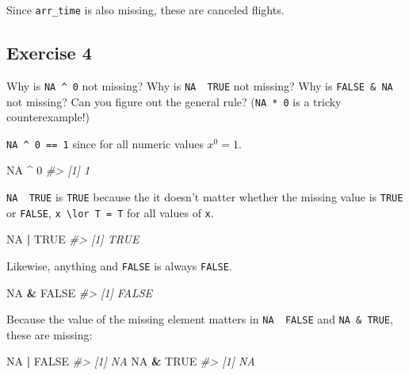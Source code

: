 \documentclass[]{book}
\newenvironment{Shaded}{\begin{snugshade}}{\end{snugshade}}
\newcommand{\CommentTok}[1]{\textcolor[rgb]{0.56,0.35,0.01}{\textit{#1}}}
\newcommand{\DecValTok}[1]{\textcolor[rgb]{0.00,0.00,0.81}{#1}}
\newcommand{\OperatorTok}[1]{\textcolor[rgb]{0.81,0.36,0.00}{\textbf{#1}}}
\newcommand{\OtherTok}[1]{\textcolor[rgb]{0.56,0.35,0.01}{#1}}
\newcommand{\StringTok}[1]{\textcolor[rgb]{0.31,0.60,0.02}{#1}}
\theoremstyle{plain}
\theoremstyle{remark}
\theoremstyle{definition}
\theoremstyle{definition}
\theoremstyle{definition}
\theoremstyle{remark}
\begin{document}
Since \texttt{arr\_time} is also missing, these are canceled flights.

\hypertarget{exercise-4-3}{%
\subsection{Exercise 4}\label{exercise-4-3}}

Why is \texttt{NA\ \^{}\ 0} not missing? Why is
\texttt{NA\ \textbar{}\ TRUE} not missing? Why is \texttt{FALSE\ \&\ NA}
not missing? Can you figure out the general rule? (\texttt{NA\ *\ 0} is
a tricky counterexample!)

\texttt{NA\ \^{}\ 0\ ==\ 1} since for all numeric values \(x ^ 0 = 1\).

\begin{Shaded}
\begin{Highlighting}[]
\OtherTok{NA} \OperatorTok{^}\StringTok{ }\DecValTok{0}
\CommentTok{#> [1] 1}
\end{Highlighting}
\end{Shaded}

\texttt{NA\ \textbar{}\ TRUE} is \texttt{TRUE} because the it doesn't
matter whether the missing value is \texttt{TRUE} or \texttt{FALSE},
\texttt{x\ \textbackslash{}lor\ T\ =\ T} for all values of \texttt{x}.

\begin{Shaded}
\begin{Highlighting}[]
\OtherTok{NA} \OperatorTok{|}\StringTok{ }\OtherTok{TRUE}
\CommentTok{#> [1] TRUE}
\end{Highlighting}
\end{Shaded}

Likewise, anything and \texttt{FALSE} is always \texttt{FALSE}.

\begin{Shaded}
\begin{Highlighting}[]
\OtherTok{NA} \OperatorTok{&}\StringTok{ }\OtherTok{FALSE}
\CommentTok{#> [1] FALSE}
\end{Highlighting}
\end{Shaded}

Because the value of the missing element matters in
\texttt{NA\ \textbar{}\ FALSE} and \texttt{NA\ \&\ TRUE}, these are
missing:

\begin{Shaded}
\begin{Highlighting}[]
\OtherTok{NA} \OperatorTok{|}\StringTok{ }\OtherTok{FALSE}
\CommentTok{#> [1] NA}
\OtherTok{NA} \OperatorTok{&}\StringTok{ }\OtherTok{TRUE}
\CommentTok{#> [1] NA}
\end{Highlighting}
\end{Shaded}
\end{document}
